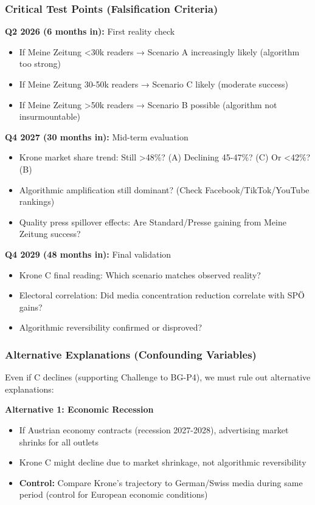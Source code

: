 \subsubsection*{Critical Test Points (Falsification Criteria)}

\textbf{Q2 2026 (6 months in):} First reality check
\begin{itemize}
\item If Meine Zeitung <30k readers → Scenario A increasingly likely (algorithm too strong)
\item If Meine Zeitung 30-50k readers → Scenario C likely (moderate success)
\item If Meine Zeitung >50k readers → Scenario B possible (algorithm not insurmountable)
\end{itemize}

\textbf{Q4 2027 (30 months in):} Mid-term evaluation
\begin{itemize}
\item Krone market share trend: Still >48\%? (A) Declining 45-47\%? (C) Or <42\%? (B)
\item Algorithmic amplification still dominant? (Check Facebook/TikTok/YouTube rankings)
\item Quality press spillover effects: Are Standard/Presse gaining from Meine Zeitung success?
\end{itemize}

\textbf{Q4 2029 (48 months in):} Final validation
\begin{itemize}
\item Krone C final reading: Which scenario matches observed reality?
\item Electoral correlation: Did media concentration reduction correlate with SPÖ gains?
\item Algorithmic reversibility confirmed or disproved?
\end{itemize}

\subsubsection*{Alternative Explanations (Confounding Variables)}

Even if C declines (supporting Challenge to BG-P4), we must rule out alternative explanations:

\textbf{Alternative 1: Economic Recession}
\begin{itemize}
\item If Austrian economy contracts (recession 2027-2028), advertising market shrinks for all outlets
\item Krone C might decline due to market shrinkage, not algorithmic reversibility
\item \textbf{Control:} Compare Krone's trajectory to German/Swiss media during same period (control for European economic conditions)
\end{itemize}

